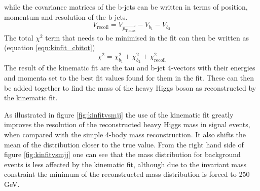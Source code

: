 while the covariance matrices of the b-jets can be written in terms of position, momentum and resolution of the b-jets. 
~\vspace{-0.5\baselineskip}
\begin{equation}\label{eqn:kinfit_recoilcov}
V_{\text{recoil}} = V_{\vec{p_{\text{T,miss}}}} - V_{b_{1}} - V_{b_2} 
\end{equation}
The total $\chi^2$ term that needs to be minimised in the fit can then be written as (equation \ref{eqn:kinfit_chitot})
~\vspace{-0.5\baselineskip}
\begin{equation}\label{eqn:kinfit_chitot}
\chi^2 = \chi^2_{b_1} + \chi^2_{b_2} + \chi^2_{\text{recoil}}
\end{equation}
The result of the kinematic fit are the tau and b-jet 4-vectors with their energies and momenta
set to the best fit values found for them in the fit. These can then be added together to find
the mass of the heavy Higgs boson as reconstructed by the kinematic fit.

As illustrated in figure \ref{fig:kinfitvsmjj} the use of the kinematic fit greatly
improves the resolution of the reconstructed heavy Higgs mass in signal events, when 
compared with the simple 4-body mass reconstruction. It also shifts the mean of the
distribution closer to the true value. From the right hand side of
figure \ref{fig:kinfitvsmjj} one can see that the mass distribution for
background events is less affected by the kinematic fit, although due to the
invariant mass constraint the minimum of the reconstructed mass distribution
is forced to 250 GeV.

